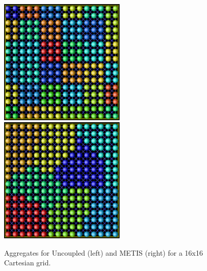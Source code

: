 \begin{figure}[htbp]
  \centering
  \includegraphics[height=6cm]{ml_Uncoupled-16x16.ps} \hspace{0.5cm}
  \includegraphics[height=6cm]{ml_METIS-16x16.ps}
  \caption{Aggregates for Uncoupled (left) and METIS (right) for a 16x16 Cartesian grid.}
  \label{fig:ml:comparison}
\end{figure}

